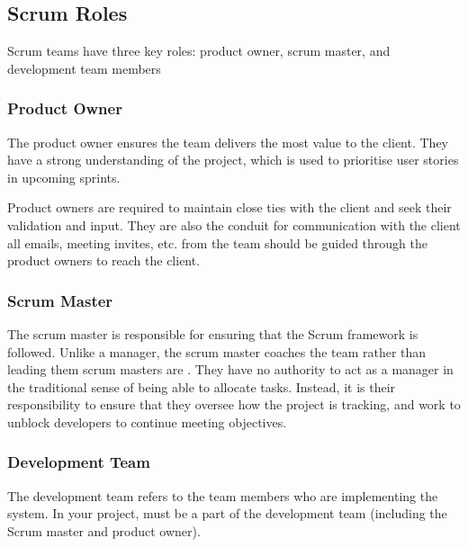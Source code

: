 \documentclass[letterpaper,10pt,english]{jupyterBook}
\begin{document}
\subsection{Scrum Roles}
\label{\detokenize{chapter_1/agile_methodology:scrum-roles}}
\sphinxAtStartPar
Scrum teams have three key roles: product owner, scrum master, and development team members


\subsubsection{Product Owner}
\label{\detokenize{chapter_1/agile_methodology:product-owner}}
\sphinxAtStartPar
The product owner ensures the team delivers the most value to the client. They have a strong
understanding of the project, which is used to prioritise user stories in upcoming sprints.

\sphinxAtStartPar
{}

\sphinxAtStartPar
{} 

\sphinxAtStartPar
Product owners are required to maintain close ties with the client and
seek their validation and input. They are also the conduit for
communication with the client \sphinxhyphen{} all emails, meeting invites, etc. from
the team should be guided through the product owners to reach the
client.


\subsubsection{Scrum Master}
\label{\detokenize{chapter_1/agile_methodology:scrum-master}}
\sphinxAtStartPar
The scrum master is responsible for ensuring that the Scrum framework is
followed. Unlike a manager, the scrum master coaches the team rather
than leading them \sphinxhyphen{} scrum masters are . They have no
authority to act as a manager in the traditional sense of being able to
allocate tasks. Instead, it is their responsibility to ensure that they
oversee how the project is tracking, and work to unblock developers to
continue meeting objectives.

\sphinxAtStartPar
{}

\sphinxAtStartPar
{} 


\subsubsection{Development Team}
\label{\detokenize{chapter_1/agile_methodology:development-team}}
\sphinxAtStartPar
The development team refers to the team members who are implementing the
system. In your project,  must be a part of the
development team (including the Scrum master and product owner).
\end{document}
